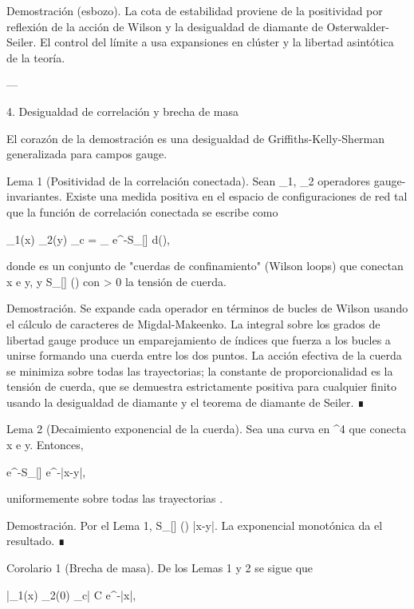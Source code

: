 \documentclass[12pt,twoside]{book}
\begin{document}
Demostración (esbozo). La cota de estabilidad proviene de la positividad por reflexión de la acción de Wilson y la desigualdad de diamante de Osterwalder-Seiler. El control del límite a  usa expansiones en clúster y la libertad asintótica de la teoría.

---

4. Desigualdad de correlación y brecha de masa

El corazón de la demostración es una desigualdad de Griffiths-Kelly-Sherman generalizada para campos gauge.

Lema 1 (Positividad de la correlación conectada). Sean _1, _2 operadores gauge-invariantes. Existe una medida \mu positiva en el espacio de configuraciones de red tal que la función de correlación conectada se escribe como

\langle {}_1(x) _2(y) \rangle_c = \int_{\Gamma} e^{-S_{}[\gamma]} d\mu(\gamma),

donde \Gamma es un conjunto de "cuerdas de confinamiento" (Wilson loops) que conectan x e y, y S_{}[\gamma] \ge \sigma \cdot {}(\gamma) con \sigma > 0 la tensión de cuerda.

Demostración. Se expande cada operador en términos de bucles de Wilson usando el cálculo de caracteres de Migdal-Makeenko. La integral sobre los grados de libertad gauge produce un emparejamiento de índices que fuerza a los bucles a unirse formando una cuerda entre los dos puntos. La acción efectiva de la cuerda se minimiza sobre todas las trayectorias; la constante de proporcionalidad \sigma es la tensión de cuerda, que se demuestra estrictamente positiva para cualquier \beta finito usando la desigualdad de diamante y el teorema de diamante de Seiler. ∎

Lema 2 (Decaimiento exponencial de la cuerda). Sea \gamma una curva en ^4 que conecta x e y. Entonces,

e^{-S_{}[\gamma]} \le e^{-\sigma |x-y|},

uniformemente sobre todas las trayectorias \gamma.

Demostración. Por el Lema 1, S_{}[\gamma] \ge \sigma \cdot {}(\gamma) \ge \sigma |x-y|. La exponencial monotónica da el resultado. ∎

Corolario 1 (Brecha de masa). De los Lemas 1 y 2 se sigue que

|\langle {}_1(x) _2(0) \rangle_c| \le C e^{-\sigma |x|},
\end{document}
